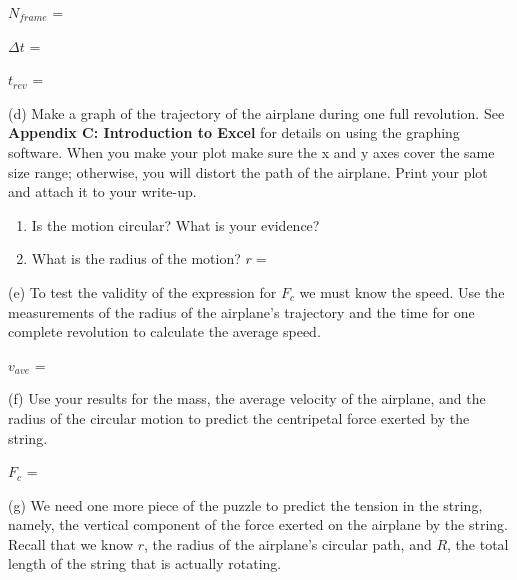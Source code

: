 \hspace{0.5in} \( N_{frame} \) = 

\hspace{0.5in} \( \Delta t \) = 

\hspace{0.5in} \( t_{rev} \) = 

(d) Make a graph of the trajectory of the airplane during one full revolution.
See \textbf{Appendix C: Introduction to Excel} for details on using
the graphing software. When you make your plot make sure the x and y axes cover
the same size range; otherwise, 
you will distort the path of the airplane. Print
your plot and attach it to your write-up.

\begin{enumerate}
\item Is the motion circular? What is your evidence?\vspace{10mm}

\item What is the radius of the motion? $r =$
\end{enumerate}
(e) To test the validity of the expression for \( F_{c} \) we must know the
speed. Use the measurements of the radius of the airplane's trajectory and the
time for one complete revolution to calculate the average speed.
\vspace{5mm}

\hspace{0.5in} \( v_{ave} \) = 
\vspace{5mm}

(f) Use your results for the mass, the average velocity of the airplane, and
the radius of the circular motion to predict the centripetal force exerted by
the string.
\vspace{5mm}

\hspace{0.5in} \( F_{c} \) = 
\vspace{5mm}

(g) We need one more piece of the puzzle to predict the tension in the string,
namely, the vertical component of the force exerted on the airplane by the string.
Recall that we know $r$, the radius of the airplane's circular path, and 
$R$, the
total length of the string that is actually rotating. 

